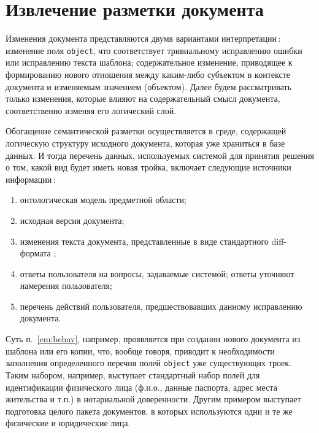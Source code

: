 \documentclass[utf8]{../IncArticle}
\begin{document}
\section{Извлечение разметки документа} \label{sec:markupproc}

Изменения документа представляются двумя вариантами интерпретации\,:
изменение поля \texttt{object}, что соответствует тривиальному
исправлению ошибки или исправлению текста шаблона; содержательное
изменение, приводящее к формированию нового отношения между каким-либо
субъектом в контексте документа и изменяемым значением (объектом).
Далее будем рассматривать только изменения, которые влияют на
содержательный смысл документа, соответственно изменяя его логический
слой.

Обогащение семантической разметки осуществляется в среде, содержащей
логическую структуру исходного документа, которая уже храниться в базе
данных.  И тогда перечень данных, используемых системой для принятия
решения о том, какой вид будет иметь новая тройка, включает следующие
источники информации\,:
\begin{enumerate}
\item онтологическая модель предметной области;
\item исходная версия документа;
\item изменения текста документа, представленные в виде стандартного
  diff-формата \cite{diff};
\item ответы пользователя на вопросы, задаваемые системой; ответы
  уточняют намерения пользователя;
\item перечень действий пользователя, предшествовавших данному
  исправлению документа. \label{em:behav}
\end{enumerate}
Суть п.~\ref{em:behav}, например, проявляется при создании нового
документа из шаблона или его копии, что, вообще говоря, приводит к
необходимости заполнения определенного перечня полей \texttt{object}
уже существующих троек.  Таким набором, например, выступает
стандартный набор полей для идентификации физического лица (ф.и.о.,
данные паспорта, адрес места жительства и т.п.) в нотариальной
доверенности.  Другим примером выступает подготовка целого пакета
документов, в которых используются одни и те же физические и
юридические лица.
\end{document}
